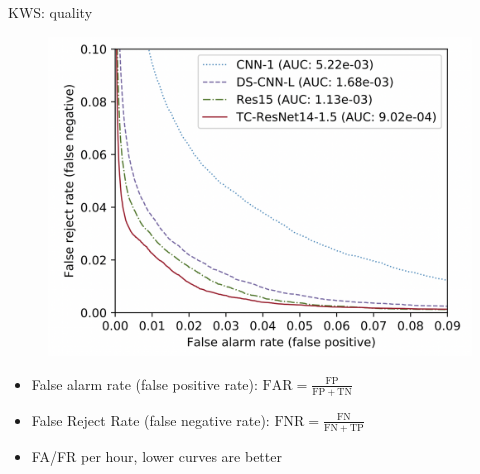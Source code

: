 \begin{frame}{KWS: quality}
    \begin{figure}
    	\centering
    	\includegraphics[width=0.65\linewidth]{figs/far_frr_plot.png}
    \end{figure}
    \begin{itemize}
        \item False alarm rate (false positive rate): $\mathrm{FAR}=\frac{\mathrm{FP}}{\mathrm{FP}+\mathrm{TN}}$
        \item False Reject Rate (false negative rate):
        $\mathrm{FNR}=\frac{\mathrm{FN}}{\mathrm{FN}+\mathrm{TP}}$
        \item FA/FR per hour, lower curves are better
    \end{itemize}
    

\end{frame}
